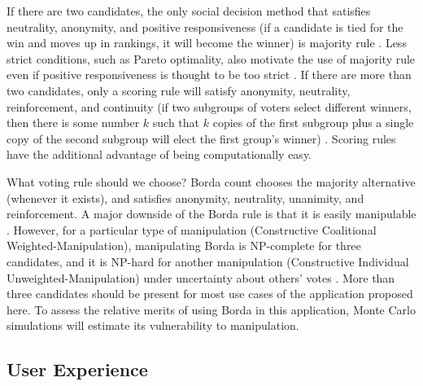 \documentclass[12pt,letterpaper]{article} %
\begin{document}
If there are two candidates, the only social decision method that satisfies neutrality, anonymity, and positive responsiveness (if a candidate is tied for the win and moves up in rankings, it will become the winner) is majority rule \citep{may1952}. Less strict conditions, such as Pareto optimality, also motivate the use of majority rule even if positive responsiveness is thought to be too strict \citep{acsan2002,j2003majority}. If there are more than two candidates, only a scoring rule will satisfy anonymity, neutrality, reinforcement, and continuity (if two subgroups of voters select different winners, then there is some number $k$ such that $k$ copies of the first subgroup plus a single copy of the second subgroup will elect the first group's winner) \citep{young1975}. Scoring rules have the additional advantage of being computationally easy.

What voting rule should we choose? Borda count chooses the majority alternative (whenever it exists), and satisfies anonymity, neutrality, unanimity, and reinforcement. A major downside of the Borda rule is that it is easily manipulable \citep{bartholdi1989computational}. However, for a particular type of manipulation (Constructive Coalitional Weighted-Manipulation), manipulating Borda is NP-complete for three candidates, and it is NP-hard for another manipulation (Constructive Individual Unweighted-Manipulation) under uncertainty about others' votes \citep{conitzer2007elections}. More than three candidates should be present for most use cases of the application proposed here. To assess the relative merits of using Borda in this application, Monte Carlo simulations will estimate its vulnerability to manipulation.


\subsection{User Experience}
\end{document}
